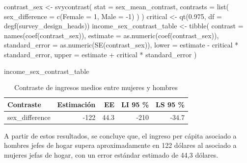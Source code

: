 \documentclass[
  spanish,
  11pt,
  letterpaper,
  oneside,
  open=any]{scrbook}
\newenvironment{Shaded}{\begin{snugshade}}{\end{snugshade}}
\newcommand{\AttributeTok}[1]{\textcolor[rgb]{0.40,0.45,0.13}{#1}}
\newcommand{\DecValTok}[1]{\textcolor[rgb]{0.68,0.00,0.00}{#1}}
\newcommand{\FloatTok}[1]{\textcolor[rgb]{0.68,0.00,0.00}{#1}}
\newcommand{\FunctionTok}[1]{\textcolor[rgb]{0.28,0.35,0.67}{#1}}
\newcommand{\NormalTok}[1]{\textcolor[rgb]{0.00,0.23,0.31}{#1}}
\newcommand{\OtherTok}[1]{\textcolor[rgb]{0.00,0.23,0.31}{#1}}
\newcommand{\SpecialCharTok}[1]{\textcolor[rgb]{0.37,0.37,0.37}{#1}}
\begin{document}
\begin{Shaded}
\begin{Highlighting}[]
\NormalTok{contrast\_sex }\OtherTok{\textless{}{-}} \FunctionTok{svycontrast}\NormalTok{(}
  \AttributeTok{stat =}\NormalTok{ sex\_mean\_contrast,}
  \AttributeTok{contrasts =} \FunctionTok{list}\NormalTok{(}
    \AttributeTok{sex\_difference =} \FunctionTok{c}\NormalTok{(}\AttributeTok{Female =} \DecValTok{1}\NormalTok{, }\AttributeTok{Male =} \SpecialCharTok{{-}}\DecValTok{1}\NormalTok{)}
\NormalTok{  )}
\NormalTok{)}
\NormalTok{critical }\OtherTok{\textless{}{-}} \FunctionTok{qt}\NormalTok{(}\FloatTok{0.975}\NormalTok{, }\AttributeTok{df =} \FunctionTok{degf}\NormalTok{(survey\_design\_heads))}
\NormalTok{income\_sex\_contrast\_table }\OtherTok{\textless{}{-}} \FunctionTok{tibble}\NormalTok{(}
  \AttributeTok{contrast =} \FunctionTok{names}\NormalTok{(}\FunctionTok{coef}\NormalTok{(contrast\_sex)),}
  \AttributeTok{estimate =} \FunctionTok{as.numeric}\NormalTok{(}\FunctionTok{coef}\NormalTok{(contrast\_sex)),}
  \AttributeTok{standard\_error =} \FunctionTok{as.numeric}\NormalTok{(}\FunctionTok{SE}\NormalTok{(contrast\_sex)),}
  \AttributeTok{lower =}\NormalTok{ estimate }\SpecialCharTok{{-}}\NormalTok{ critical }\SpecialCharTok{*}\NormalTok{ standard\_error,}
  \AttributeTok{upper =}\NormalTok{ estimate }\SpecialCharTok{+}\NormalTok{ critical }\SpecialCharTok{*}\NormalTok{ standard\_error}
\NormalTok{)}

\NormalTok{income\_sex\_contrast\_table}
\end{Highlighting}
\end{Shaded}

{

\begin{longtable}[]{@{}lrrrr@{}}

\caption{\label{tbl-contraste-sexo}Contraste de ingresos medios entre
mujeres y hombres}

\tabularnewline

\toprule\noalign{}
Contraste & Estimación & EE & LI 95 \% & LS 95 \% \\
\midrule\noalign{}
\endhead
\bottomrule\noalign{}
\endlastfoot
sex\_difference & -122 & 44.3 & -210 & -34.7 \\

\end{longtable}

}

A partir de estos resultados, se concluye que, el ingreso per cápita
asociado a hombres jefes de hogar supera aproximadamente en 122 dólares
al asociado a mujeres jefas de hogar, con un error estándar estimado de
44,3 dólares.
\end{document}
